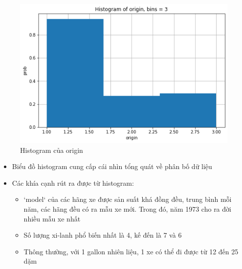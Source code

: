 \documentclass[a4paper, 12pt]{article}
\begin{document}
        \begin{figure}[H]
            \centering
                \includegraphics[scale=0.9]{img/origin.png}
                \caption{Histogram của origin}
        \end{figure}
        
        \begin{itemize}
            \item Biểu đồ histogram cung cấp cái nhìn tổng quát về phân bố dữ liệu
            \item Các khía cạnh rút ra được từ histogram:
                \begin{itemize}
                    \item `model` của các hãng xe được sản suất khá đồng đều, trung bình mỗi năm, các hãng đều có ra mẫu xe mới. Trong đó, năm 1973 cho ra đời nhiều mẫu xe nhất
                    \item Số lượng xi-lanh phổ biến nhất là 4, kế đến là 7 và 6
                    \item Thông thường, với 1 gallon nhiên liệu, 1 xe có thể đi được từ 12 đến 25 dặm
                \end{itemize}
        \end{itemize}
    
\end{document}
